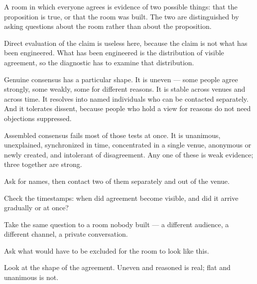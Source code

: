 


\begin{core}
A room in which everyone agrees is evidence of two possible things: that the proposition is true, or that the room was built. The two are distinguished by asking questions about the room rather than about the proposition.
\end{core}

\begin{mechanism}
Direct evaluation of the claim is useless here, because the claim is not what has been engineered. What has been engineered is the distribution of visible agreement, so the diagnostic has to examine that distribution.

Genuine consensus has a particular shape. It is uneven --- some people agree strongly, some weakly, some for different reasons. It is stable across venues and across time. It resolves into named individuals who can be contacted separately. And it tolerates dissent, because people who hold a view for reasons do not need objections suppressed.

Assembled consensus fails most of those tests at once. It is unanimous, unexplained, synchronized in time, concentrated in a single venue, anonymous or newly created, and intolerant of disagreement. Any one of these is weak evidence; three together are strong.
\end{mechanism}

\begin{application}
  \item Ask for names, then contact two of them separately and out of the venue.
  \item Check the timestamps: when did agreement become visible, and did it arrive gradually or at once?
  \item Take the same question to a room nobody built --- a different audience, a different channel, a private conversation.
  \item Ask what would have to be excluded for the room to look like this.
  \item Look at the shape of the agreement. Uneven and reasoned is real; flat and unanimous is not.
\end{application}

